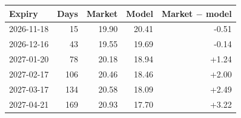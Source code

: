 \begin{tabular}{@{}lrrrr@{}}
\toprule
\textbf{Expiry} & \textbf{Days} & \textbf{Market} & \textbf{Model} & \textbf{Market $-$ model}\\
\midrule
2026-11-18 & 15 & 19.90 & 20.41 & -0.51 \\
2026-12-16 & 43 & 19.55 & 19.69 & -0.14 \\
2027-01-20 & 78 & 20.18 & 18.94 & +1.24 \\
2027-02-17 & 106 & 20.46 & 18.46 & +2.00 \\
2027-03-17 & 134 & 20.58 & 18.09 & +2.49 \\
2027-04-21 & 169 & 20.93 & 17.70 & +3.22 \\
\bottomrule
\end{tabular}
